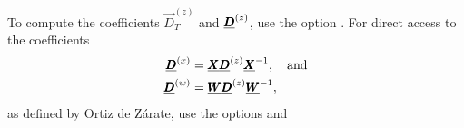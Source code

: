 To compute the coefficients $\Vec{D}_T^{(z)}$ and $\underline{\pmb{D}}^{(z)}$, use the option . For direct access to the coefficients
\begin{equation}
    \begin{split}
        \underline{\pmb{D}}^{(x)} &= \underline{\pmb{X}} \underline{\pmb{D}}^{(z)} \underline{\pmb{X}}^{-1}, \quad \text{and} \\
        \underline{\pmb{D}}^{(w)} &= \underline{\pmb{W}} \underline{\pmb{D}}^{(z)} \underline{\pmb{W}}^{-1},
    \end{split}
\end{equation}
as defined by Ortiz de Zárate,\cite{ortiz2019definition} use the options  and 